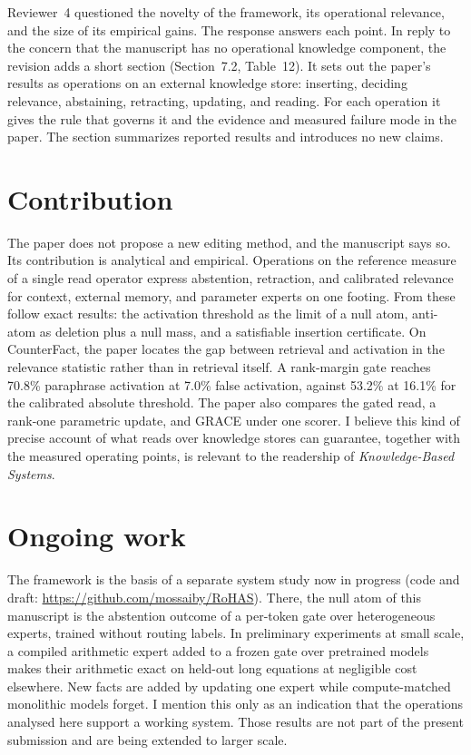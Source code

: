 \documentclass[11pt]{article}
\begin{document}
Reviewer~4 questioned the novelty of the framework, its operational relevance, and the size of its empirical gains. The response answers each point. In reply to the concern that the manuscript has no operational knowledge component, the revision adds a short section (Section~7.2, Table~12). It sets out the paper's results as operations on an external knowledge store: inserting, deciding relevance, abstaining, retracting, updating, and reading. For each operation it gives the rule that governs it and the evidence and measured failure mode in the paper. The section summarizes reported results and introduces no new claims.

\section*{Contribution}

The paper does not propose a new editing method, and the manuscript says so. Its contribution is analytical and empirical. Operations on the reference measure of a single read operator express abstention, retraction, and calibrated relevance for context, external memory, and parameter experts on one footing. From these follow exact results: the activation threshold as the limit of a null atom, anti-atom as deletion plus a null mass, and a satisfiable insertion certificate. On CounterFact, the paper locates the gap between retrieval and activation in the relevance statistic rather than in retrieval itself. A rank-margin gate reaches 70.8\% paraphrase activation at 7.0\% false activation, against 53.2\% at 16.1\% for the calibrated absolute threshold. The paper also compares the gated read, a rank-one parametric update, and GRACE under one scorer. I believe this kind of precise account of what reads over knowledge stores can guarantee, together with the measured operating points, is relevant to the readership of \emph{Knowledge-Based Systems}.

\section*{Ongoing work}

The framework is the basis of a separate system study now in progress (code and draft: \url{https://github.com/mossaiby/RoHAS}). There, the null atom of this manuscript is the abstention outcome of a per-token gate over heterogeneous experts, trained without routing labels. In preliminary experiments at small scale, a compiled arithmetic expert added to a frozen gate over pretrained models makes their arithmetic exact on held-out long equations at negligible cost elsewhere. New facts are added by updating one expert while compute-matched monolithic models forget. I mention this only as an indication that the operations analysed here support a working system. Those results are not part of the present submission and are being extended to larger scale.
\end{document}
